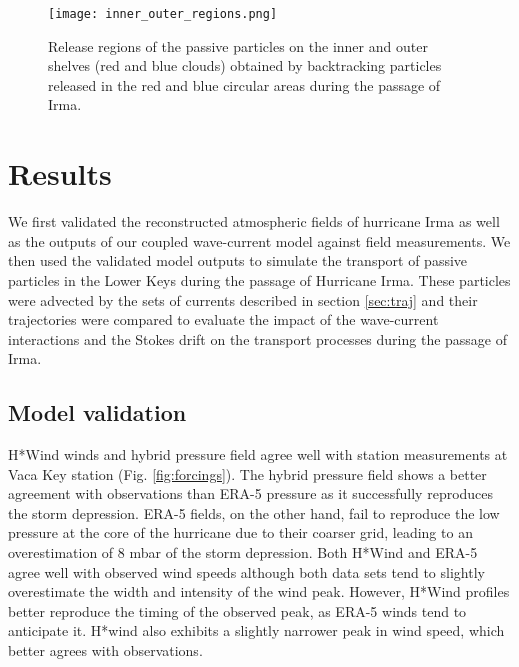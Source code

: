 \documentclass[preprint,12pt,authoryear]{elsarticle}
\begin{document}
\begin{figure}
    \centering
    \texttt{[image: inner\_outer\_regions.png]}
    \caption{Release regions of the passive particles on the inner and outer shelves (red and blue clouds) obtained by backtracking particles released in the red and blue circular areas during the passage of Irma.}
    \label{fig:init}
\end{figure}

\section{Results}

We first validated the reconstructed atmospheric fields of hurricane Irma as well as the outputs of our coupled wave-current model against field measurements. We then used the validated model outputs to simulate the transport of passive particles in the Lower Keys during the passage of Hurricane Irma. These particles were advected by the sets of currents described in section \ref{sec:traj} and their trajectories were compared to evaluate the impact of the wave-current interactions and the Stokes drift on the transport processes during the passage of Irma.

\subsection{Model validation}

H*Wind winds and hybrid pressure field agree well with station measurements at Vaca Key station (Fig. \ref{fig:forcings}). The hybrid pressure field shows a better agreement with observations than ERA-5 pressure as it successfully reproduces the storm depression. ERA-5 fields, on the other hand, fail to reproduce the low pressure at the core of the hurricane due to their coarser grid, leading to an overestimation of 8 mbar of the storm depression. Both H*Wind and ERA-5 agree well with observed wind speeds although both data sets tend to slightly overestimate the width and intensity of the wind peak. However, H*Wind profiles better reproduce the timing of the observed peak, as ERA-5 winds tend to anticipate it. H*wind also exhibits a slightly narrower peak in wind speed, which better agrees with observations.
\end{document}
